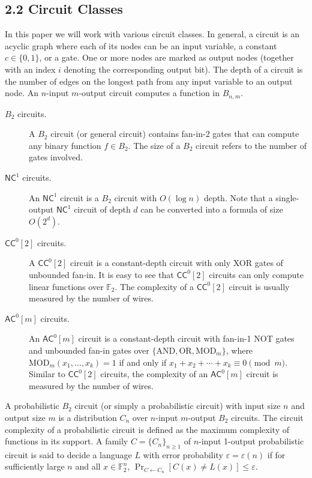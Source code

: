 \subsection*{2.2 Circuit Classes}
In this paper we will work with various circuit classes. In general, a circuit is an acyclic graph where each of its nodes can be an input variable, a constant $c\in\{0,1\}$, or a gate. One or more nodes are marked as output nodes (together with an index $i$ denoting the corresponding output bit). The depth of a circuit is the number of edges on the longest path from any input variable to an output node. An $n$-input $m$-output circuit computes a function in $B_{n,m}$.
\begin{description}
\item[{$B_2$ circuits.}] A $B_2$ circuit (or general circuit) contains fan-in-2 gates that can compute any binary function $f\in B_2$. The size of a $B_2$ circuit refers to the number of gates involved.
\item[{$\mathsf{NC}^1$ circuits.}] An $\mathsf{NC}^1$ circuit is a $B_2$ circuit with $O(\log n)$ depth. Note that a single-output $\mathsf{NC}^1$ circuit of depth $d$ can be converted into a formula of size $O(2^d)$.
\item[{$\mathsf{CC}^0[2]$ circuits.}] A $\mathsf{CC}^0[2]$ circuit is a constant-depth circuit with only XOR gates of unbounded fan-in. It is easy to see that $\mathsf{CC}^0[2]$ circuits can only compute linear functions over $\mathbb F_2$. The complexity of a $\mathsf{CC}^0[2]$ circuit is usually measured by the number of wires.
\item[{$\mathsf{AC}^0[m]$ circuits.}] An $\mathsf{AC}^0[m]$ circuit is a constant-depth circuit with fan-in-1 NOT gates and unbounded fan-in gates over $\{\mathrm{AND},\mathrm{OR},\mathrm{MOD}_m\}$, where $\mathrm{MOD}_m(x_1,\ldots,x_k)=1$ if and only if $x_1+x_2+\cdots+x_k\equiv0\pmod m$. Similar to $\mathsf{CC}^0[2]$ circuits, the complexity of an $\mathsf{AC}^0[m]$ circuit is measured by the number of wires.
\end{description}
A probabilistic $B_2$ circuit (or simply a probabilistic circuit) with input size $n$ and output size $m$ is a distribution $C_n$ over $n$-input $m$-output $B_2$ circuits. The circuit complexity of a probabilistic circuit is defined as the maximum complexity of functions in its support. A family $C=\{C_n\}_{n\ge1}$ of $n$-input 1-output probabilistic circuit is said to decide a language $L$ with error probability $\varepsilon=\varepsilon(n)$ if for sufficiently large $n$ and all $x\in\mathbb F_2^n$, $\Pr_{C\leftarrow C_n}[C(x)\ne L(x)]\le\varepsilon$.
